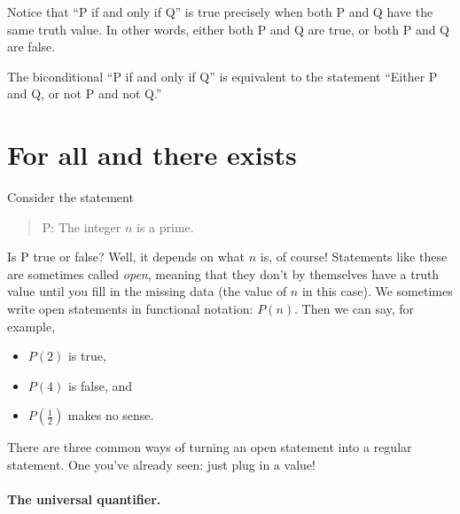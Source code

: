 \documentclass{tufte-book}
\begin{document}
Notice that ``P if and only if Q'' is true precisely when both P and Q have the same truth value. In other words, either both P and Q are true, or both P and Q are false.

\begin{proposition}\label{prop:biconditional-equiv-or}
  The biconditional ``P if and only if Q'' is equivalent to the statement ``Either P and Q, or not P and not Q.''
\end{proposition}



\section{For all and there exists}
\label{sec:quantifiers}

Consider the statement
\begin{quote}
  P: The integer $n$ is a prime.
\end{quote}
Is P true or false? Well, it depends on what $n$ is, of course! Statements like these are sometimes called \emph{open}, meaning that they don't by themselves have a truth value until you fill in the missing data (the value of $n$ in this case). We sometimes write open statements in functional notation: $P(n)$. Then we can say, for example,
\begin{itemize}
    \item $P(2)$ is true,
    \item $P(4)$ is false, and
    \item $P(\frac12)$ makes no sense.
\end{itemize}

  There are three common ways of turning an open statement into a regular statement. One you've already seen: just plug in a value!

\paragraph{The universal quantifier.}
\label{sec:univ-quant}
\end{document}
